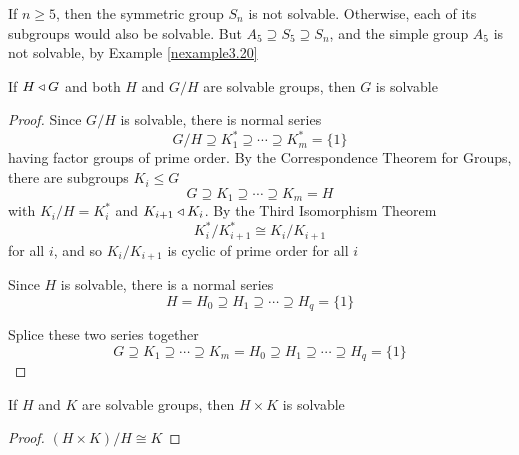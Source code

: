 \documentclass[11pt]{article}
\begin{document}
\begin{examplle}[]
\label{nexample3.24}
If \(n\ge5\), then the symmetric group \(S_n\) is not solvable. Otherwise, each
of its subgroups would also be solvable. But \(A_5\supseteq S_5\supseteq
    S_n\), and the simple group \(A_5\) is not solvable, by Example \ref{nexample3.20}
\end{examplle}

\begin{proposition}[]
If \(H\triangleleft G\) and both \(H\) and \(G/H\) are solvable groups, then \(G\) is solvable
\end{proposition}

\begin{proof}
Since \(G/H\) is solvable, there is normal series
\begin{equation*}
G/H\supseteq K_1^*\supseteq\cdots\supseteq K_m^*=\{1\}
\end{equation*}
having factor groups of prime order. By the Correspondence Theorem for
Groups, there are subgroups \(K_i\le G\)
\begin{equation*}
G\supseteq K_1\supseteq\cdots\supseteq K_m=H
\end{equation*}
with \(K_i/H=K_i^*\) and \(K_{i+1}\triangleleft K_i\). By the Third Isomorphism
Theorem
\begin{equation*}
K_i^*/K_{i+1}^*\cong K_i/K_{i+1}
\end{equation*}
for all \(i\), and so \(K_i/K_{i+1}\) is cyclic of prime order for all \(i\)

Since \(H\) is solvable, there is a normal series
\begin{equation*}
H=H_0\supseteq H_1\supseteq\cdots\supseteq H_q=\{1\}
\end{equation*}

Splice these two series together
\begin{equation*}
G\supseteq K_1\supseteq\cdots\supseteq K_m=H_0\supseteq H_1\supseteq\cdots
\supseteq H_q=\{1\}
\end{equation*}
\end{proof}

\begin{corollary}[]
If \(H\) and \(K\) are solvable groups, then \(H\times K\) is solvable
\end{corollary}
\begin{proof}
\((H\times K)/H\cong K\)
\end{proof}
\end{document}
